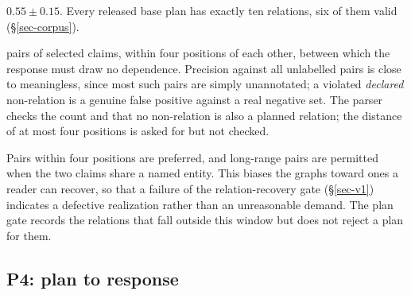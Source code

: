 \begin{description}[leftmargin=1.2em,itemsep=2pt,topsep=3pt,font=\normalfont\itshape]
  $0.55\pm0.15$. Every released base plan has exactly ten relations, six of them valid
  (\S\ref{sec-corpus}).
\item[Four to six non-relations are declared:] pairs of selected claims, within four positions of each other,
  between which the response must draw no dependence. Precision against all unlabelled pairs is close to
  meaningless, since most such pairs are simply unannotated; a violated \emph{declared} non-relation is a genuine
  false positive against a real negative set. The parser checks the count and that no non-relation is also a
  planned relation; the distance of at most four positions is asked for but not checked.
\item[Relations are local by default.] Pairs within four positions are preferred, and long-range pairs are
  permitted when the two claims share a named entity. This biases the graphs toward ones a reader can recover, so
  that a failure of the relation-recovery gate (\S\ref{sec-v1}) indicates a defective realization rather than an
  unreasonable demand. The plan gate records the relations that fall outside this window but does not reject a
  plan for them.
\end{description}

\subsection{P4: plan to response}
\label{sec-p4}

